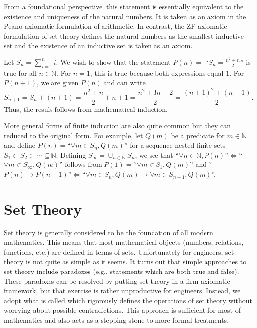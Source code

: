 From a foundational perspective, this statement is essentially equivalent to the existence and uniqueness of the natural numbers.
It is taken as an axiom in the Peano axiomatic formulation of arithmetic.
In contrast, the ZF axiomatic formulation of set theory defines the natural numbers as the smallest inductive set and the existence of an inductive set is taken as an axiom.

\begin{example}
Let $S_n = \sum_{i=1}^n i$.
We wish to show that the statement $P(n)=$ ``$S_n = \frac{n^2 + n}{2}$'' is true for all $n\in \mathbb{N}$.
For $n=1$, this is true because both expressions equal $1$.
For $P(n+1)$, we are given $P(n)$ and can write
\[ S_{n+1} = S_n + (n+1) = \frac{n^2 + n}{2} + n+1 = \frac{n^2 + 3n + 2}{2} = \frac{(n+1)^2+(n+1)}{2}. \]
Thus, the result follows from mathematical induction.
\end{example}

More general forms of finite induction are also quite common but they can reduced to the original form.
For example, let $Q(m)$ be a predicate for $m\in \mathbb{N}$ and define $P(n) =$``$\forall m\in S_n, Q(m)$'' for a sequence nested finite sets $S_1 \subset S_2 \subset \cdots \subseteq \mathbb{N}$.
Defining $S_\infty = \cup_{n\in \mathbb{N}} S_n$, we see that ``$\forall n\in\mathbb{N}, P(n)$''$\Leftrightarrow$``$\forall m\in S_\infty, Q(m)$'' follows from $P(1)=$``$\forall m\in S_1, Q(m)$'' and ``$P(n)\to P(n+1)$''$\Leftrightarrow$``$\forall m\in S_n, Q(m) \rightarrow \forall {m} \in S_{n+1}, Q(m)$''.

\section{Set Theory}
Set theory is generally considered to be the foundation of all modern mathematics.
This means that most mathematical objects (numbers, relations, functions, etc.) are defined in terms of sets.
Unfortunately for engineers, set theory is not quite as simple as it seems.
It turns out that simple approaches to set theory include paradoxes (e.g., statements which are both true and false).
These paradoxes can be resolved by putting set theory in a firm axiomatic framework, but that exercise is rather unproductive for engineers.
Instead, we adopt what is called  which rigorously defines the operations of set theory without worrying about possible contradictions.
This approach is sufficient for most of mathematics and also acts as a stepping-stone to more formal treatments.

